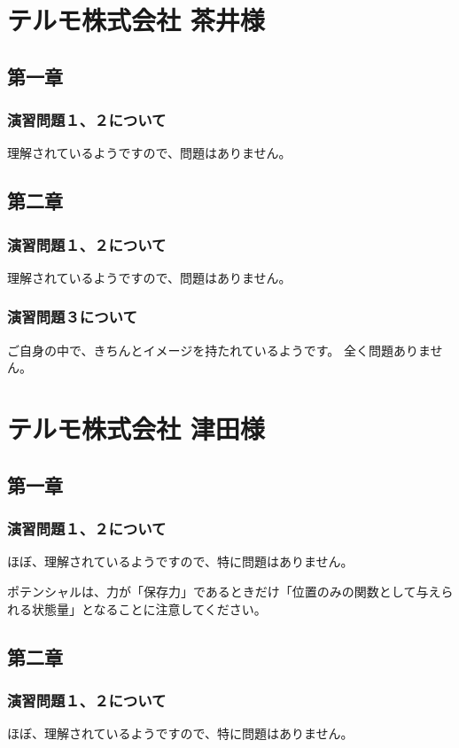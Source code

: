 \documentclass[uplatex,dvipdfmx,a4paper,11pt]{jsreport}
\begin{document}
\clearpage

\section*{テルモ株式会社 茶井様}
\subsection*{第一章}
\subsubsection*{演習問題１、２について}
理解されているようですので、問題はありません。

\subsection*{第二章}
\subsubsection*{演習問題１、２について}
理解されているようですので、問題はありません。

\subsubsection*{演習問題３について}

ご自身の中で、きちんとイメージを持たれているようです。
全く問題ありません。

\clearpage

\section*{テルモ株式会社 津田様}
\subsection*{第一章}
\subsubsection*{演習問題１、２について}
ほぼ、理解されているようですので、特に問題はありません。

ポテンシャルは、力が「保存力」であるときだけ「位置のみの関数として与えられる状態量」となることに注意してください。


\subsection*{第二章}
\subsubsection*{演習問題１、２について}
ほぼ、理解されているようですので、特に問題はありません。
\end{document}
